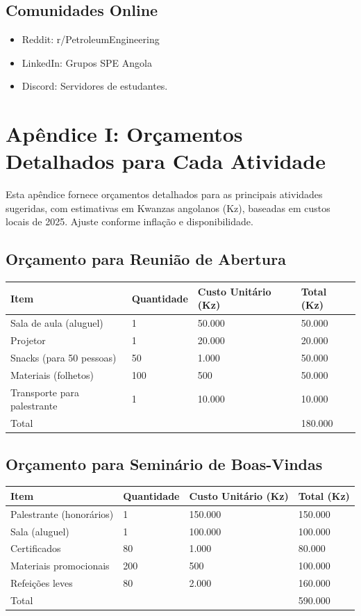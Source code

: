 \documentclass[12pt]{article}
\begin{document}
\subsection{Comunidades Online}
\begin{itemize}
    \item Reddit: r/PetroleumEngineering
    \item LinkedIn: Grupos SPE Angola
    \item Discord: Servidores de estudantes.
\end{itemize}

\clearpage
\section{Apêndice I: Orçamentos Detalhados para Cada Atividade}

Esta apêndice fornece orçamentos detalhados para as principais atividades sugeridas, com estimativas em Kwanzas angolanos (Kz), baseadas em custos locais de 2025. Ajuste conforme inflação e disponibilidade.

\subsection{Orçamento para Reunião de Abertura}
\begin{longtable}{|l|l|l|l|}
\hline
Item & Quantidade & Custo Unitário (Kz) & Total (Kz) \\
\hline
Sala de aula (aluguel) & 1 & 50.000 & 50.000 \\
Projetor & 1 & 20.000 & 20.000 \\
Snacks (para 50 pessoas) & 50 & 1.000 & 50.000 \\
Materiais (folhetos) & 100 & 500 & 50.000 \\
Transporte para palestrante & 1 & 10.000 & 10.000 \\
\hline
Total & & & 180.000 \\
\hline
\end{longtable}

\subsection{Orçamento para Seminário de Boas-Vindas}
\begin{longtable}{|l|l|l|l|}
\hline
Item & Quantidade & Custo Unitário (Kz) & Total (Kz) \\
\hline
Palestrante (honorários) & 1 & 150.000 & 150.000 \\
Sala (aluguel) & 1 & 100.000 & 100.000 \\
Certificados & 80 & 1.000 & 80.000 \\
Materiais promocionais & 200 & 500 & 100.000 \\
Refeições leves & 80 & 2.000 & 160.000 \\
\hline
Total & & & 590.000 \\
\hline
\end{longtable}
\end{document}
